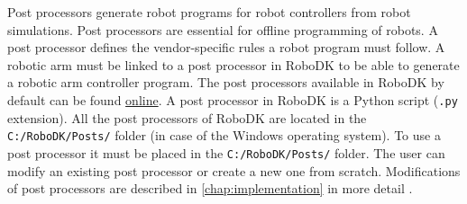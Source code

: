Post processors generate robot programs for robot controllers from robot simulations. Post processors are essential for offline programming of robots. A post processor defines the vendor-specific rules a robot program must follow. A robotic arm must be linked to a post processor in RoboDK to be able to generate a robotic arm controller program. The post processors available in RoboDK by default can be found \href{https://robodk.com/doc/en/Post-Processors.html#AvailablePosts}{online}.  
A post processor in RoboDK is a Python script (\texttt{.py} extension). All the post processors of RoboDK are located in the
\texttt{C:/RoboDK/Posts/} folder (in case of the Windows operating system).  To use a post processor it must be placed in the \texttt{C:/RoboDK/Posts/} folder. The user can modify an existing post processor or create a new one from scratch. Modifications of post processors are described in \autoref{chap:implementation} in more detail \cite{robodkposts}. 